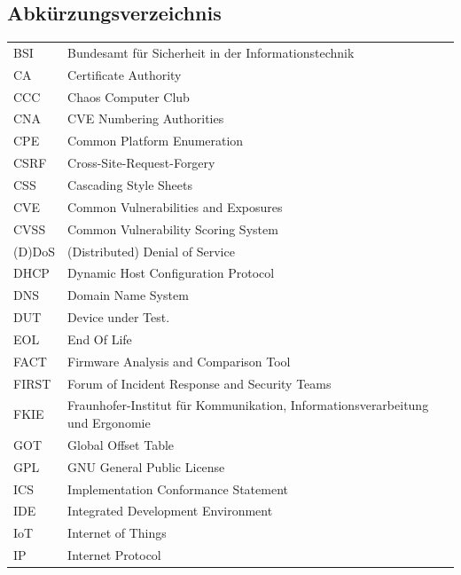 \documentclass[a4paper]{book}
\begin{document}
\begin{large}
\section*{Abkürzungsverzeichnis}
\let\cleardoublepage\clearpage
\begin{table}[!ht]
\centering
\begin{tabular}{ll}
BSI   & Bundesamt für Sicherheit in der   Informationstechnik                             \\
CA      & Certificate Authority                \\
CCC     & Chaos Computer Club                  \\
CNA     & CVE Numbering Authorities            \\
CPE     & Common Platform Enumeration          \\
CSRF    & Cross-Site-Request-Forgery           \\
CSS     & Cascading Style Sheets               \\
CVE     & Common Vulnerabilities and Exposures \\
CVSS    & Common Vulnerability Scoring System  \\
(D)DoS    & (Distributed) Denial of Service        \\
DHCP    & Dynamic Host Configuration Protocol  \\
DNS     & Domain Name System                   \\
DUT     & Device under Test.                   \\
EOL     & End Of Life                          \\
FACT  & Firmware Analysis   and   Comparison Tool                                         \\
FIRST & Forum of Incident Response and Security Teams                                     \\
FKIE  & Fraunhofer-Institut für   Kommunikation,   Informationsverarbeitung und Ergonomie \\
GOT     & Global Offset Table                  \\
GPL     & GNU General Public License           \\
ICS     & Implementation Conformance Statement \\
IDE     & Integrated Development Environment   \\
IoT     & Internet of Things                   \\
IP      & Internet Protocol                    \\

\end{tabular}
\end{table}
\end{large}
\end{document}

